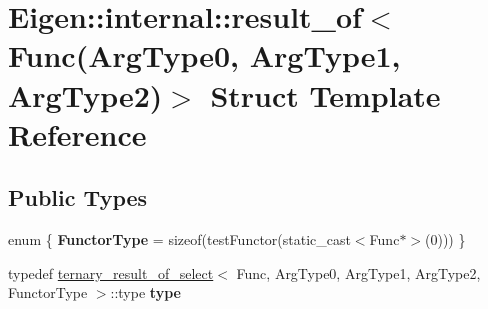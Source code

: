 \hypertarget{struct_eigen_1_1internal_1_1result__of_3_01_func_07_arg_type0_00_01_arg_type1_00_01_arg_type2_08_4}{}\section{Eigen\+::internal\+::result\+\_\+of$<$ Func(Arg\+Type0, Arg\+Type1, Arg\+Type2)$>$ Struct Template Reference}
\label{struct_eigen_1_1internal_1_1result__of_3_01_func_07_arg_type0_00_01_arg_type1_00_01_arg_type2_08_4}
\subsection*{Public Types}
\begin{DoxyCompactItemize}
\item 
\mbox{\label{struct_eigen_1_1internal_1_1result__of_3_01_func_07_arg_type0_00_01_arg_type1_00_01_arg_type2_08_4_acc0e9e8a99a215ae66dffd2425b865b4}} 
enum \{ {\bfseries Functor\+Type} = sizeof(test\+Functor(static\+\_\+cast$<$Func$\ast$$>$(0)))
 \}
\item 
\mbox{\label{struct_eigen_1_1internal_1_1result__of_3_01_func_07_arg_type0_00_01_arg_type1_00_01_arg_type2_08_4_acb34a93dd86b197d202b904fc55d8e35}} 
typedef \mbox{\hyperlink{struct_eigen_1_1internal_1_1ternary__result__of__select}{ternary\+\_\+result\+\_\+of\+\_\+select}}$<$ Func, Arg\+Type0, Arg\+Type1, Arg\+Type2, Functor\+Type $>$\+::type {\bfseries type}
\end{DoxyCompactItemize}
